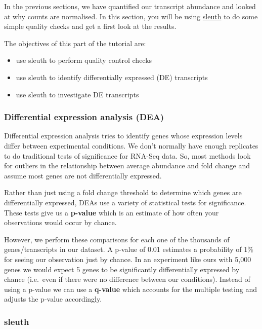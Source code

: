 \documentclass[11pt]{article}
\providecommand{\tightlist}{%
      \setlength{\itemsep}{0pt}\setlength{\parskip}{0pt}}
\begin{document}
In the previous sections, we have quantified our transcript abundance
and looked at why counts are normalised. In this section, you will be
using \href{https://pachterlab.github.io/sleuth}{sleuth} to do some
simple quality checks and get a first look at the results.

The objectives of this part of the tutorial are:

\begin{itemize}
\tightlist
\item
  use sleuth to perform quality control checks
\item
  use sleuth to identify differentially expressed (DE) transcripts
\item
  use sleuth to investigate DE transcripts
\end{itemize}

\hypertarget{differential-expression-analysis-dea}{%
\subsubsection{Differential expression analysis
(DEA)}\label{differential-expression-analysis-dea}}

Differential expression analysis tries to identify genes whose
expression levels differ between experimental conditions. We don't
normally have enough replicates to do traditional tests of significance
for RNA-Seq data. So, most methods look for outliers in the relationship
between average abundance and fold change and assume most genes are not
differentially expressed.

Rather than just using a fold change threshold to determine which genes
are differentially expressed, DEAs use a variety of statistical tests
for significance. These tests give us a \textbf{p-value} which is an
estimate of how often your observations would occur by chance.

However, we perform these comparisons for each one of the thousands of
genes/transcripts in our dataset. A p-value of 0.01 estimates a
probability of 1\% for seeing our observation just by chance. In an
experiment like ours with 5,000 genes we would expect 5 genes to be
significantly differentially expressed by chance (i.e.~even if there
were no difference between our conditions). Instead of using a p-value
we can use a \textbf{q-value} which accounts for the multiple testing
and adjusts the p-value accordingly.

\hypertarget{sleuth}{%
\subsubsection{sleuth}\label{sleuth}}
\end{document}
